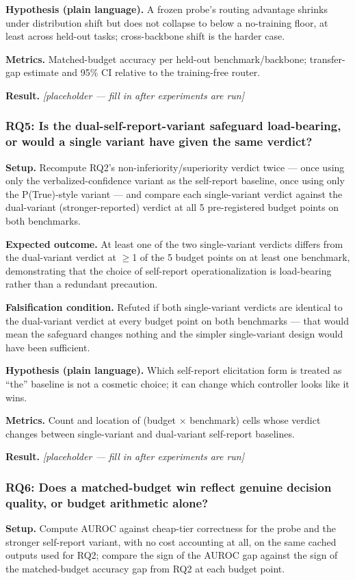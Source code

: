 \documentclass[11pt]{article}
\newcommand{\ph}{\textit{[placeholder --- fill in after experiments are run]}}
\begin{document}
\textbf{Hypothesis (plain language).} A frozen probe's routing advantage shrinks under distribution shift but does not collapse to below a no-training floor, at least across held-out tasks; cross-backbone shift is the harder case.

\textbf{Metrics.} Matched-budget accuracy per held-out benchmark/backbone; transfer-gap estimate and 95\% CI relative to the training-free router.

\textbf{Result.} \ph

\subsubsection{RQ5: Is the dual-self-report-variant safeguard load-bearing, or would a single variant have given the same verdict?}
\textbf{Setup.} Recompute RQ2's non-inferiority/superiority verdict twice --- once using only the verbalized-confidence variant as the self-report baseline, once using only the P(True)-style variant --- and compare each single-variant verdict against the dual-variant (stronger-reported) verdict at all 5 pre-registered budget points on both benchmarks.

\textbf{Expected outcome.} At least one of the two single-variant verdicts differs from the dual-variant verdict at $\geq$1 of the 5 budget points on at least one benchmark, demonstrating that the choice of self-report operationalization is load-bearing rather than a redundant precaution.

\textbf{Falsification condition.} Refuted if both single-variant verdicts are identical to the dual-variant verdict at every budget point on both benchmarks --- that would mean the safeguard changes nothing and the simpler single-variant design would have been sufficient.

\textbf{Hypothesis (plain language).} Which self-report elicitation form is treated as ``the'' baseline is not a cosmetic choice; it can change which controller looks like it wins.

\textbf{Metrics.} Count and location of (budget $\times$ benchmark) cells whose verdict changes between single-variant and dual-variant self-report baselines.

\textbf{Result.} \ph

\subsubsection{RQ6: Does a matched-budget win reflect genuine decision quality, or budget arithmetic alone?}
\textbf{Setup.} Compute AUROC against cheap-tier correctness for the probe and the stronger self-report variant, with no cost accounting at all, on the same cached outputs used for RQ2; compare the sign of the AUROC gap against the sign of the matched-budget accuracy gap from RQ2 at each budget point.
\end{document}
